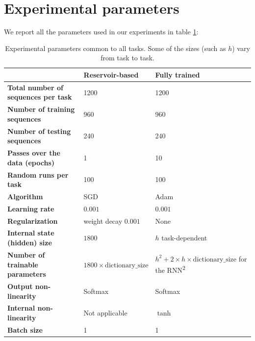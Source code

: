 \section{Experimental parameters}
\label{sec:parameters}
We report all the parameters used in our experiments in table \ref{tab:appendix-params}:
\begin{table}[htbp]
  \centering
  \begin{tabular}{lp{.2\linewidth}p{.35\linewidth}}
    \toprule
    & \bfseries Reservoir-based & \bfseries Fully trained \\
    \midrule
    \bfseries Total number of sequences per task & 1200 & 1200 \\
    \bfseries Number of training sequences & 960 & 960 \\
    \bfseries Number of testing sequences & 240 & 240 \\
    \bfseries Passes over the data (epochs) & 1 & 10 \\
    \bfseries Random runs per task & 100 & 100\\
    \bfseries Algorithm & SGD & Adam \cite{kingmaAdamMethodStochastic2015}\\
    \bfseries Learning rate & $0.001$ & $0.001$ \\
    \bfseries Regularization & weight decay $0.001$ & None \\
    \bfseries Internal state (hidden) size & $1800$ & $h$ task-dependent \\
    \bfseries Number of trainable parameters & $1800 \times \text{dictionary\_size}$ &
      $h^{2} + 2 \times h \times \text{dictionary\_size}$ for the RNN\textsuperscript{2}\\
    \bfseries Output non-linearity & Softmax & Softmax \\
    \bfseries Internal non-linearity & Not applicable & $\tanh$ \\
    \bfseries Batch size  & 1 & 1 \\
    \bottomrule
  \end{tabular}
  \caption{Experimental parameters common to all tasks. Some of the sizes (such
    as $h$) vary from task to task.}
  \label{tab:appendix-params}
\end{table}

